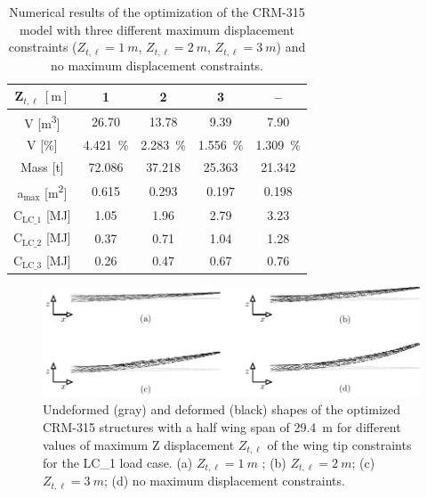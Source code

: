 \begin{table}
    \small
    \centering
    \begin{tabular}{ccccc}
    \toprule
    $\bm{Z}_{t,\ell}\:[\text{m}]$ & 1&2&3&--\\ \midrule
    V [\unit{\meter^3}]&  26.70&13.78&9.39&7.90\\
    V [\unit{\%}]&   \qty{4.421}{\%}   & \qty{2.283}{\%}&\qty{1.556}{\%}&\qty{1.309}{\%}  \\
    Mass [\unit{\tonne}]  &72.086&37.218&25.363&21.342\\
    a$_{\text{max}}$ [\unit{\meter^2}]&  0.615    & 0.293&0.197&0.198\\
    C$_\text{LC\_1}$ [\unit{\mega \joule}]   &  1.05    &  1.96&2.79& 3.23\\
    C$_\text{LC\_2}$ [\unit{\mega \joule}]   &   0.37   &  0.71&1.04& 1.28\\
    C$_\text{LC\_3}$ [\unit{\mega \joule}]   &   0.26   &  0.47&0.67& 0.76\\

    \bottomrule
    \end{tabular}
    \caption{Numerical results of the optimization of the CRM-315 model with three different maximum displacement constraints ($Z_{t,\ell}=\qty{1}{m}$, $Z_{t,\ell}=\qty{2}{m}$, $Z_{t,\ell}=\qty{3}{m}$) and no maximum displacement constraints.}
    \label{tab:07_disp}
\end{table}

\begin{figure}
    \centering
    \includegraphics[width=\linewidth]{figures/07_aeronautic/00_dispalcements/disp.pdf}
     \caption{Undeformed (gray) and deformed (black) shapes of the optimized CRM-315 structures with a half wing span of \qty{29.4}{m} for different values of maximum Z displacement $Z_{t,\ell}$ of the wing tip constraints for the LC\_1 load case. (a) $Z_{t,\ell}=\qty{1}{m}$  ; (b) $Z_{t,\ell}=\qty{2}{m}$; (c) $Z_{t,\ell}=\qty{3}{m}$; (d) no maximum displacement constraints.}
    \label{fig:07_disp_sol}
\end{figure}

